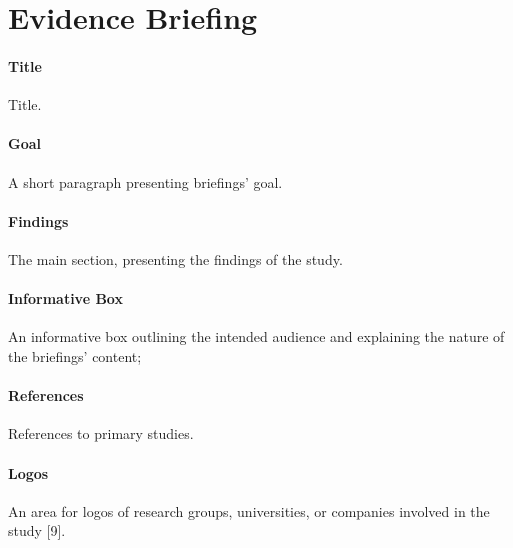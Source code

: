\section{Evidence Briefing}

\paragraph{Title}
Title.

\paragraph{Goal}
A short paragraph presenting briefings’ goal.

\paragraph{Findings}
The main section, presenting the findings of the study.

\paragraph{Informative Box}
An informative box outlining the intended audience and explaining the nature of the briefings’ content; 

\paragraph{References}
References to primary studies.

\paragraph{Logos}
An area for logos of research groups, universities, or companies involved in the study [9].
